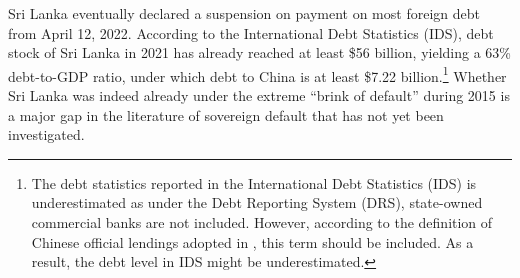 Sri Lanka eventually declared a suspension on payment on most foreign debt from April 12, 2022. According to the International Debt Statistics (IDS), debt stock of Sri Lanka in 2021 has already reached at least \$56 billion, yielding a 63\% debt-to-GDP ratio, under which debt to China is at least \$7.22 billion.\footnote{
    The debt statistics reported in the International Debt Statistics (IDS) is underestimated as under the Debt Reporting System (DRS), state-owned commercial banks are not included. However, according to the definition of Chinese official lendings adopted in \citet*{Horn-Reinhart-Trebesch-21}, this term should be included. As a result, the debt level in IDS might be underestimated.
}
Whether Sri Lanka was indeed already under the extreme ``brink of default'' during 2015 is a major gap in the literature of sovereign default that has not yet been investigated.
